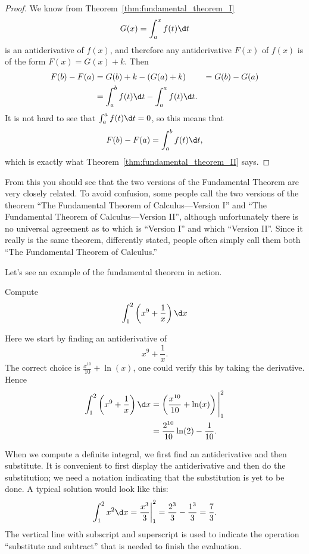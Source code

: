 \begin{proof}
We know from Theorem~\ref{thm:fundamental_theorem_I} 
\[
  G(x)=\int_a^x f(t)\d t
\]
is an antiderivative of $f(x)$, and therefore any antiderivative
$F(x)$ of $f(x)$ is of the form $F(x)=G(x)+k$. Then 
\begin{align*}
  F(b)-F(a) &=G(b)+k-(G(a)+k) 
  &= G(b)-G(a) \\
  &=\int_a^b f(t)\d t-\int_a^a f(t)\d t.
\end{align*}
It is not hard to see that $\int_a^a f(t)\d t=0$, so this means that
\[
  F(b)-F(a)=\int_a^b f(t)\d t,
\]
which is exactly what Theorem~\ref{thm:fundamental_theorem_II} says.
\end{proof}

From this you should see that the two versions of the Fundamental
Theorem are very closely related. To avoid confusion, some people call
the two versions of the theorem ``The Fundamental Theorem of
Calculus---Version I'' and ``The Fundamental Theorem of
Calculus---Version II'', although unfortunately there is no universal
agreement as to which is ``Version I'' and which ``Version II''. Since
it really is the same theorem, differently stated, people often simply
call them both ``The Fundamental Theorem of Calculus.''

Let's see an example of the fundamental theorem in action.

\begin{example}
Compute
\[
\int_1^2\left(x^9 + \frac{1}{x}\right) \d x
\]
\end{example}

\begin{solution}
Here we start by finding an antiderivative of 
\[
x^9 + \frac{1}{x}.
\]
The correct choice is $\frac{x^{10}}{10} + \ln(x)$, one could verify this by
taking the derivative. Hence
\begin{align*}
\int_1^2\left(x^9 + \frac{1}{x}\right) \d x &= \left(\frac{x^{10}}{10} + \ln(x)\right)\Bigg|_1^2 \\
&= \frac{2^{10}}{10} \ln(2) - \frac{1}{10}.
\end{align*}
\end{solution}


When we compute a definite integral, we first find an antiderivative
and then substitute. It is convenient to first display the
antiderivative and then do the substitution; we need a notation
indicating that the substitution is yet to be done. A typical solution
would look like this:
\[
  \left.\int_1^2 x^2\d x={x^3\over 3}\right|_1^2 = 
  {2^3\over3}-{1^3\over3}={7\over3}.
\]
The vertical line with subscript and superscript is used to indicate
the operation ``substitute and subtract'' that is needed to finish the
evaluation. 

